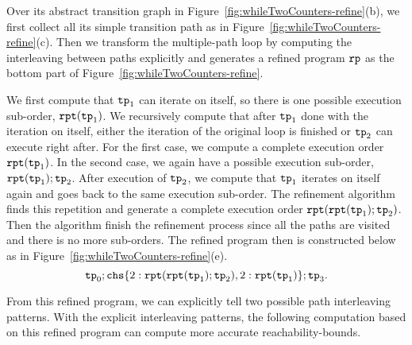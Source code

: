 Over its abstract transition graph in Figure~\ref{fig:whileTwoCounters-refine}(b), we first collect all its simple transition path as in Figure~\ref{fig:whileTwoCounters-refine}(c).
Then we transform the multiple-path loop by computing the interleaving between paths explicitly and
generates a refined program $\mathtt{rp}$ as the bottom part of Figure~\ref{fig:whileTwoCounters-refine}.

We first compute that $\mathtt{tp}_1$ can iterate on itself, so there is one possible execution sub-order,
$\mathtt{rpt}(\mathtt{tp}_1)$.
We recursively compute that after $\mathtt{tp}_1$ done with the iteration on itself,
either the iteration of the original loop is finished
or $\mathtt{tp}_2$ can execute right after.
For the first case, we compute a complete execution order $\mathtt{rpt}(\mathtt{tp}_1)$.
In the second case, we again have a possible execution sub-order, $\mathtt{rpt}(\mathtt{tp}_1); \mathtt{tp}_2$.
After execution of $\mathtt{tp}_2$, we compute that $\mathtt{tp}_1$ iterates on itself again
and goes back to the same execution sub-order. 
The refinement algorithm finds this repetition and generate a complete execution order
$\mathtt{rpt}(\mathtt{rpt}(\mathtt{tp}_1); \mathtt{tp}_2)$.
Then the algorithm finish the refinement process since all the paths are visited and there is no more sub-orders. 
The refined program then is constructed below as in Figure~\ref{fig:whileTwoCounters-refine}(e).
\[
   \tpath_0 ; 
   \rpchoose{2: \rprepeat(\rprepeat(\tpath_1); \tpath_2), 
   2: \rprepeat(\tpath_1)}; \tpath_3.
\]

From this refined program, we can explicitly tell two possible path interleaving patterns.
With the explicit interleaving patterns, the following computation based on this refined program can compute more accurate reachability-bounds.
